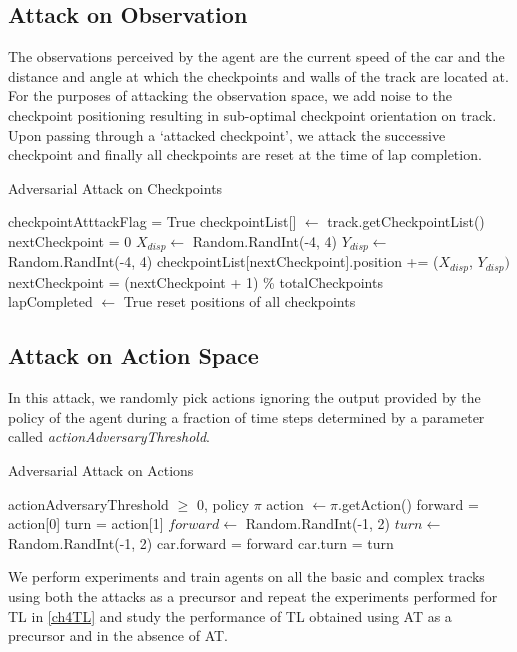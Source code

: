 \subsection{Attack on Observation} \label{at-obs}
The observations perceived by the agent are the current speed of the car and the distance and angle at which the checkpoints and walls of the track are located at. For the purposes of attacking the observation space, we add noise to the checkpoint positioning resulting in sub-optimal checkpoint orientation on track. Upon passing through a `attacked checkpoint', we attack the successive checkpoint and finally all checkpoints are reset at the time of lap completion.
\begin{algorithm}[H]
\caption{Adversarial Attack on Checkpoints}\label{alg:cap}
\begin{algorithmic}
\Require checkpointAtttackFlag = True
\State checkpointList[] $\gets$ track.getCheckpointList()
\State nextCheckpoint = 0
\State $X_{disp} \gets$ Random.RandInt(-4, 4)
\State $Y_{disp} \gets$ Random.RandInt(-4, 4)
\State checkpointList[nextCheckpoint].position += ($X_{disp}$, $Y_{disp})$\\
\State nextCheckpoint = (nextCheckpoint + 1) \% totalCheckpoints\\
 
\State lapCompleted $\gets$ True
\State reset positions of all checkpoints
\EndIf
\EndWhile
\end{algorithmic}
\end{algorithm}

\subsection{Attack on Action Space} \label{at-action}
In this attack, we randomly pick actions ignoring the output provided by the policy of the agent during a fraction of time steps determined by a parameter called \textit{actionAdversaryThreshold}.

\begin{algorithm}[H]
\caption{Adversarial Attack on Actions}\label{alg:cap}
\begin{algorithmic}
\Require actionAdversaryThreshold $\geq$ 0, policy $\pi$
\State action $\gets \pi$.getAction() 
\State forward = action[0]
\State turn = action[1]
\State $forward \gets$ Random.RandInt(-1, 2)
\State $turn \gets$ Random.RandInt(-1, 2)
\EndIf
\State car.forward = forward
\State car.turn = turn
\end{algorithmic}
\end{algorithm}


We perform experiments and train agents on all the basic and complex tracks using both the attacks as  a precursor and repeat the experiments performed for TL in \ref{ch4TL} and study the performance of TL obtained using AT as a precursor and in the absence of AT.

